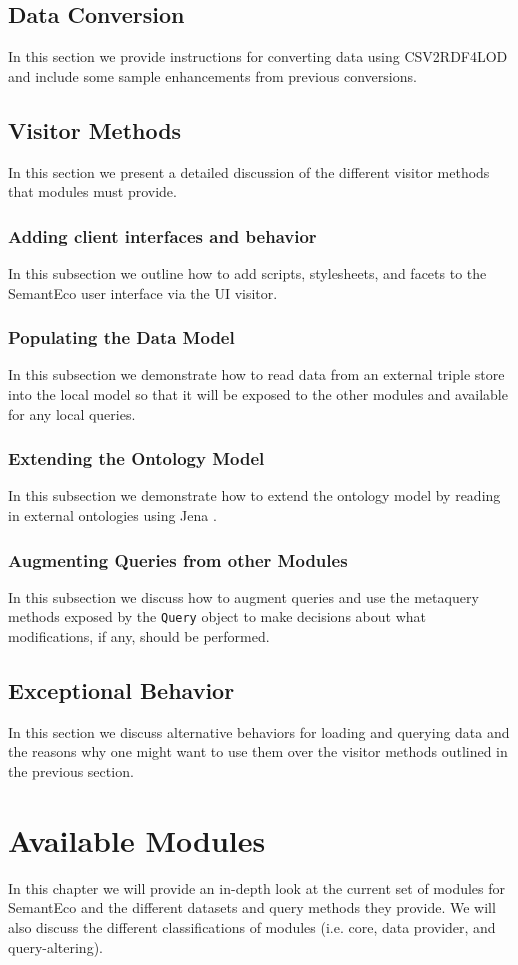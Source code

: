 \documentclass[letterpaper]{report}
\begin{document}
\section{Data Conversion}
In this section we provide instructions for converting data using CSV2RDF4LOD \cite{lebo2011producing} and include some sample enhancements from previous conversions.
\section{Visitor Methods}
\label{visitors}
In this section we present a detailed discussion of the different visitor methods that modules must provide.
\subsection{Adding client interfaces and behavior}
In this subsection we outline how to add scripts, stylesheets, and facets to the SemantEco user interface via the UI visitor.
\subsection{Populating the Data Model}
In this subsection we demonstrate how to read data from an external triple store into the local model so that it will be exposed to the other modules and available for any local queries.
\subsection{Extending the Ontology Model}
In this subsection we demonstrate how to extend the ontology model by reading in external ontologies using Jena \cite{Jena}.
\subsection{Augmenting Queries from other Modules}
In this subsection we discuss how to augment queries and use the metaquery methods exposed by the \texttt{Query} object to make decisions about what modifications, if any, should be performed.
\section{Exceptional Behavior}
In this section we discuss alternative behaviors for loading and querying data and the reasons why one might want to use them over the visitor methods outlined in the previous section.
\chapter{Available Modules}
In this chapter we will provide an in-depth look at the current set of modules for SemantEco and the different datasets and query methods they provide. We will also discuss the different classifications of modules (i.e. core, data provider, and query-altering).
\end{document}
